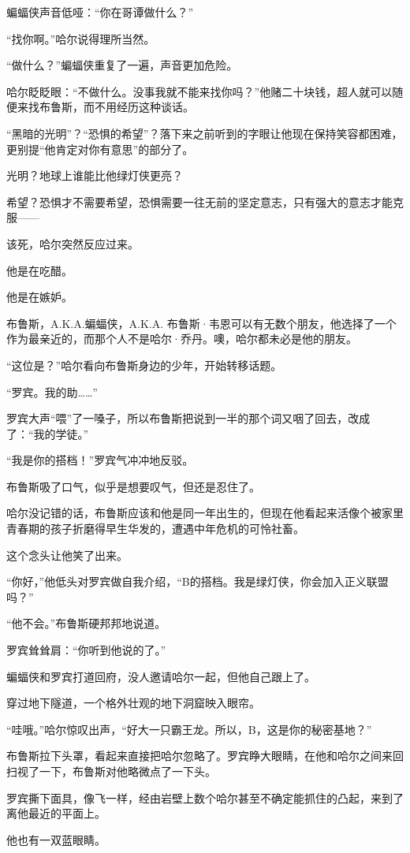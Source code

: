\documentclass[../main]{subfiles}
\begin{document}
蝙蝠侠声音低哑：“你在哥谭做什么？”

“找你啊。”哈尔说得理所当然。

“做什么？”蝙蝠侠重复了一遍，声音更加危险。

哈尔眨眨眼：“不做什么。没事我就不能来找你吗？”他赌二十块钱，超人就可以随便来找布鲁斯，而不用经历这种谈话。

“黑暗的光明”？“恐惧的希望”？落下来之前听到的字眼让他现在保持笑容都困难，更别提“他肯定对你有意思”的部分了。

光明？地球上谁能比他绿灯侠更亮？

希望？恐惧才不需要希望，恐惧需要一往无前的坚定意志，只有强大的意志才能克服——

该死，哈尔突然反应过来。

他是在吃醋。

他是在嫉妒。

布鲁斯，A.K.A.蝙蝠侠，A.K.A.
布鲁斯·韦恩可以有无数个朋友，他选择了一个作为最亲近的，而那个人不是哈尔·乔丹。噢，哈尔都未必是他的朋友。

“这位是？”哈尔看向布鲁斯身边的少年，开始转移话题。

“罗宾。我的助\ldots\ldots”

罗宾大声“喂”了一嗓子，所以布鲁斯把说到一半的那个词又咽了回去，改成了：“我的学徒。”

“我是你的搭档！”罗宾气冲冲地反驳。

布鲁斯吸了口气，似乎是想要叹气，但还是忍住了。

哈尔没记错的话，布鲁斯应该和他是同一年出生的，但现在他看起来活像个被家里青春期的孩子折磨得早生华发的，遭遇中年危机的可怜社畜。

这个念头让他笑了出来。

“你好，”他低头对罗宾做自我介绍，“B的搭档。我是绿灯侠，你会加入正义联盟吗？”

“他不会。”布鲁斯硬邦邦地说道。

罗宾耸耸肩：“你听到他说的了。”

蝙蝠侠和罗宾打道回府，没人邀请哈尔一起，但他自己跟上了。

穿过地下隧道，一个格外壮观的地下洞窟映入眼帘。

“哇哦。”哈尔惊叹出声，“好大一只霸王龙。所以，B，这是你的秘密基地？”

布鲁斯拉下头罩，看起来直接把哈尔忽略了。罗宾睁大眼睛，在他和哈尔之间来回扫视了一下，布鲁斯对他略微点了一下头。

罗宾撕下面具，像飞一样，经由岩壁上数个哈尔甚至不确定能抓住的凸起，来到了离他最近的平面上。

他也有一双蓝眼睛。
\end{document}

